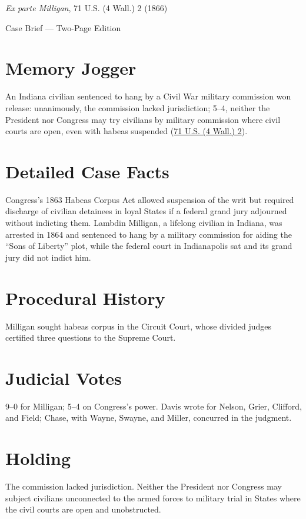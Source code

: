 \documentclass[12pt]{article}
\begin{document}
\begin{center}
{\LARGE \textit{Ex parte Milligan}, 71 U.S. (4 Wall.) 2 (1866)\par}
\vspace{0.5em}
{\large Case Brief --- Two-Page Edition\par}
\end{center}

\section{Memory Jogger}
An Indiana civilian sentenced to hang by a Civil War military commission won release: unanimously, the commission lacked jurisdiction; 5--4, neither the President nor Congress may try civilians by military commission where civil courts are open, even with habeas suspended (\href{https://supreme.justia.com/cases/federal/us/71/2/}{71 U.S. (4 Wall.) 2}).

\section{Detailed Case Facts}
Congress's 1863 Habeas Corpus Act allowed suspension of the writ but required discharge of civilian detainees in loyal States if a federal grand jury adjourned without indicting them. Lambdin Milligan, a lifelong civilian in Indiana, was arrested in 1864 and sentenced to hang by a military commission for aiding the ``Sons of Liberty'' plot, while the federal court in Indianapolis sat and its grand jury did not indict him.

\section{Procedural History}
Milligan sought habeas corpus in the Circuit Court, whose divided judges certified three questions to the Supreme Court.

\section{Judicial Votes}
9--0 for Milligan; 5--4 on Congress's power. Davis wrote for Nelson, Grier, Clifford, and Field; Chase, with Wayne, Swayne, and Miller, concurred in the judgment.

\section{Holding}
The commission lacked jurisdiction. Neither the President nor Congress may subject civilians unconnected to the armed forces to military trial in States where the civil courts are open and unobstructed.
\end{document}
